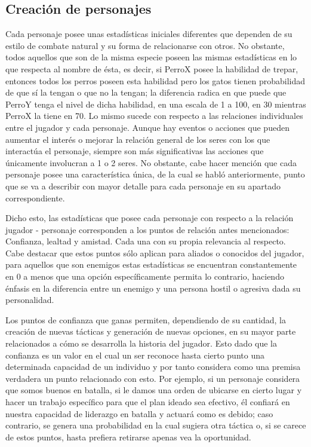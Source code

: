 \documentclass{article}
\begin{document}
\subsection{Creación de personajes}
Cada personaje posee unas estadísticas iniciales diferentes que dependen de su estilo de combate natural y su forma de relacionarse con otros. No obstante, todos aquellos que son de la misma especie poseen las mismas estadísticas en lo que respecta al nombre de ésta, es decir, si PerroX posee la habilidad de trepar, entonces todos los perros poseen esta habilidad pero los gatos tienen probabilidad de que sí la tengan o que no la tengan; la diferencia radica en que puede que PerroY tenga el nivel de dicha habilidad, en una escala de 1 a 100, en 30 mientras PerroX la tiene en 70. Lo mismo sucede con respecto a las relaciones individuales entre el jugador y cada personaje. Aunque hay eventos o acciones que pueden aumentar el interés o mejorar la relación general de los seres con los que interactúa el personaje, siempre son más significativas las acciones que únicamente involucran a 1 o 2 seres. No obstante, cabe hacer mención que cada personaje posee una característica única, de la cual se habló anteriormente, punto que se va a describir con mayor detalle para cada personaje en su apartado correspondiente.

Dicho esto, las estadísticas que posee cada personaje con respecto a la relación jugador - personaje corresponden a los puntos de relación antes mencionados: Confianza, lealtad y amistad. Cada una con su propia relevancia al respecto. Cabe destacar que estos puntos sólo aplican para aliados o conocidos del jugador, para aquellos que son enemigos estas estadísticas se encuentran constantemente en 0 a menos que una opción específicamente permita lo contrario, haciendo énfasis en la diferencia entre un enemigo y una persona hostil o agresiva dada su personalidad.

Los puntos de confianza que ganas permiten, dependiendo de su cantidad, la creación de nuevas tácticas y generación de nuevas opciones, en su mayor parte relacionados a cómo se desarrolla la historia del jugador. Esto dado que la confianza es un valor en el cual un ser reconoce hasta cierto punto una determinada capacidad de un individuo y por tanto considera como una premisa verdadera un punto relacionado con esto. Por ejemplo, si un personaje considera que somos buenos en batalla, si le damos una orden de ubicarse en cierto lugar y hacer un trabajo específico para que el plan ideado sea efectivo, él confiará en nuestra capacidad de liderazgo en batalla y actuará como es debido; caso contrario, se genera una probabilidad en la cual sugiera otra táctica o, si se carece de estos puntos, hasta prefiera retirarse apenas vea la oportunidad.
\end{document}
